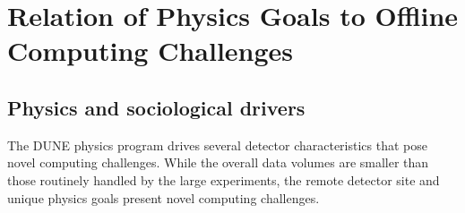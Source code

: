 \documentclass[../main-v1.tex]{subfiles}
\begin{document}


\section{Relation of Physics Goals to Offline Computing Challenges }\label{ch:intro:challenges}

\subsection{Physics and sociological drivers}
The DUNE physics program drives several detector characteristics that pose novel computing challenges.  While the overall data volumes are smaller than those routinely handled by the large  experiments, the remote detector site and unique physics goals present novel computing challenges. 
\end{document}

